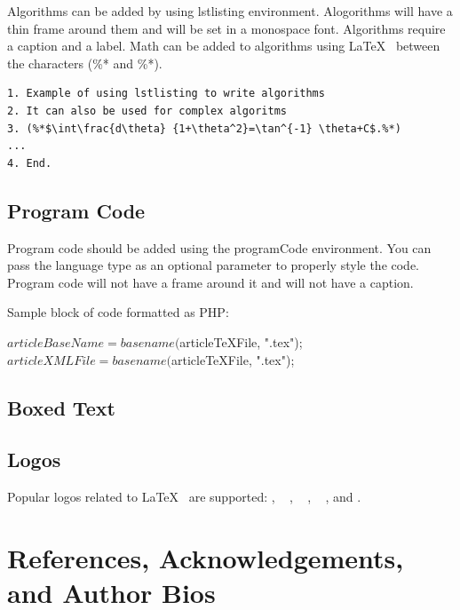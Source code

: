\documentclass{csmagazine}
\begin{document}
Algorithms can be added by using lstlisting environment. Alogorithms will have a thin frame around them and will be set in a monospace font. Algorithms require a caption and a label. Math can be added to algorithms using \LaTeX~ between the characters (\%* and \%*).



\begin{lstlisting}[caption={Add a caption for your algorithm here.}, label=Algorithm1]
1. Example of using lstlisting to write algorithms
2. It can also be used for complex algoritms
3. (%*$\int\frac{d\theta} {1+\theta^2}=\tan^{-1} \theta+C$.%*)
...
4. End. 
\end{lstlisting}

\subsection{Program Code}

Program code should be added using the programCode environment. You can pass the language type as an optional parameter to properly style the code. Program code will not have a frame around it and will not have a caption.

Sample block of code formatted as PHP:

\begin{programCode}
[language=PhP]
$articleBaseName = basename($articleTeXFile, ".tex");
$articleXMLFile = basename($articleTeXFile, ".tex");
\end{programCode}


\subsection{Boxed Text}



\subsection{Logos}

Popular logos related to \LaTeX~ are supported: \AllTeX, ~ \BibLaTeX, ~ \XeLaTeX, ~ , and .

\section{References, Acknowledgements, and Author Bios}
\end{document}
